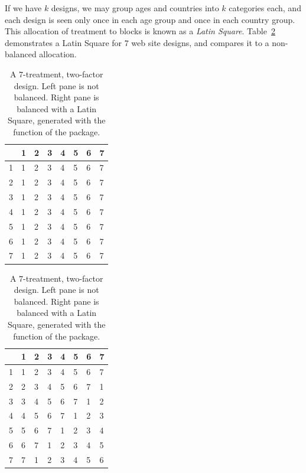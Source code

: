 If we have $k$ designs, we may group ages and countries into $k$ categories each, and each design is seen only once in each age group and once in each country group. 
This allocation of treatment to blocks is known as a \emph{Latin Square}. 
Table~\ref{tab:latin_square} demonstrates a Latin Square for $7$ web site designs, and compares it to a non-balanced allocation. 
\begin{table}[ht]
    \begin{minipage}{.5\linewidth}
        \centering
		\begin{tabular}{rlllllll}
		  \hline
		 & 1 & 2 & 3 & 4 & 5 & 6 & 7 \\ 
		  \hline
		1 & 1 & 2 & 3 & 4 & 5 & 6 & 7 \\ 
		2 & 1 & 2 & 3 & 4 & 5 & 6 & 7 \\ 
		3 & 1 & 2 & 3 & 4 & 5 & 6 & 7 \\ 
		4 & 1 & 2 & 3 & 4 & 5 & 6 & 7 \\ 
		5 & 1 & 2 & 3 & 4 & 5 & 6 & 7 \\ 
		6 & 1 & 2 & 3 & 4 & 5 & 6 & 7 \\ 
		7 & 1 & 2 & 3 & 4 & 5 & 6 & 7 \\ 
		   \hline
		\end{tabular}
    \end{minipage}%
    \begin{minipage}{.5\linewidth}
      \centering
		\begin{tabular}{rlllllll}
		  \hline
		 & 1 & 2 & 3 & 4 & 5 & 6 & 7 \\ 
		  \hline
		1 & 1 & 2 & 3 & 4 & 5 & 6 & 7 \\ 
		  2 & 2 & 3 & 4 & 5 & 6 & 7 & 1 \\ 
		  3 & 3 & 4 & 5 & 6 & 7 & 1 & 2 \\ 
		  4 & 4 & 5 & 6 & 7 & 1 & 2 & 3 \\ 
		  5 & 5 & 6 & 7 & 1 & 2 & 3 & 4 \\ 
		  6 & 6 & 7 & 1 & 2 & 3 & 4 & 5 \\ 
		  7 & 7 & 1 & 2 & 3 & 4 & 5 & 6 \\ 
		   \hline
		\end{tabular}
		\end{minipage} 
	\caption{A $7$-treatment, two-factor design. 
	Left pane is not balanced.
	Right pane is balanced with a Latin Square, generated with the  function of the  \R package.}
	\label{tab:latin_square}		
\end{table}


